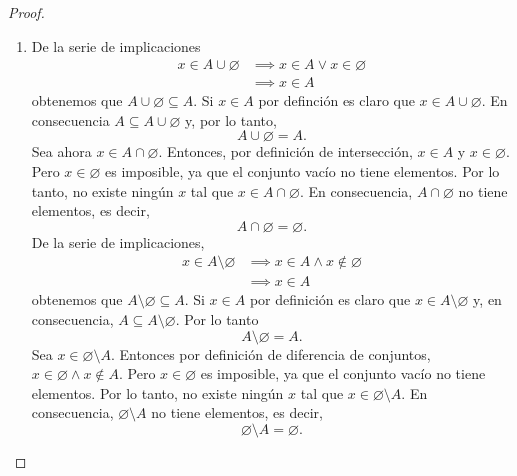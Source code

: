 \documentclass[12pt,a4paper]{article}
\begin{document}
    \begin{proof}
        \begin{enumerate}
            \item[(a)] De la serie de implicaciones
            \begin{align*}
                x\in A\cup\varnothing&\implies x\in A\lor x\in\varnothing\\
                &\implies x\in A
            \end{align*}
            obtenemos que $A\cup\varnothing\subseteq A$. Si $x\in A$ por definción es claro que $x\in A\cup\varnothing$.
            En consecuencia $A\subseteq A\cup\varnothing$ y, por lo tanto,
            \begin{equation*}
                A\cup\varnothing=A.
            \end{equation*}
            Sea ahora $x\in A\cap\varnothing$.
            Entonces, por definición de intersección, $x\in A$ y $x\in\varnothing$. Pero $x\in\varnothing$ es imposible,
            ya que el conjunto vacío no tiene elementos. Por lo tanto, no existe ningún $x$ tal que $x\in A\cap\varnothing$.
            En consecuencia, $A\cap\varnothing$ no tiene elementos, es decir,
            \begin{equation*}
                A\cap\varnothing=\varnothing.
            \end{equation*}
            De la serie de implicaciones,
            \begin{align*}
                x\in A\setminus\varnothing&\implies x\in A\wedge x\notin\varnothing\\
                &\implies x\in A
            \end{align*}
            obtenemos que $A\setminus\varnothing\subseteq A$. Si $x\in A$ por definición es claro que
            $x\in A\setminus\varnothing$ y, en consecuencia, $A\subseteq A\setminus\varnothing$. Por lo
            tanto
            \begin{equation*}
                A\setminus\varnothing=A.
            \end{equation*}
            Sea $x\in \varnothing\setminus A$. Entonces por definición de diferencia de conjuntos, $x\in\varnothing\wedge x\notin A$.
            Pero $x\in\varnothing$ es imposible, ya que el conjunto vacío no tiene elementos. Por lo tanto,
            no existe ningún $x$ tal que $x\in \varnothing\setminus A$. En consecuencia, $\varnothing\setminus A$
            no tiene elementos, es decir,
            \begin{equation*}
                \varnothing\setminus A=\varnothing.
            \end{equation*}
        \end{enumerate}
    \end{proof}
\end{document}
